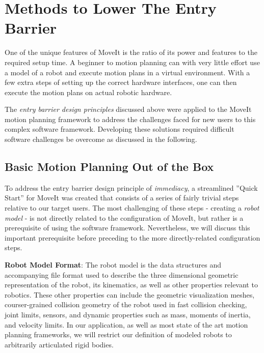 \documentclass[10pt,journal,compsoc]{joser1}
\begin{document}
{%
\section{Methods to Lower The Entry Barrier}
\label{sec::lowering_barriers}

One of the unique features of MoveIt is the ratio of its power and features to the required setup time. A beginner to motion planning can with very little effort use a model of a robot and execute motion plans in a virtual environment. With a few extra steps of setting up the correct hardware interfaces, one can then execute the motion plans on actual robotic hardware.

The \textit{entry barrier design principles} discussed above were applied to the MoveIt motion planning framework to address the challenges faced for new users to this complex software framework. Developing these solutions required difficult software challenges be overcome as discussed in the following.

\subsection{Basic Motion Planning Out of the Box}

To address the entry barrier design principle of \textit{immediacy}, a streamlined ''Quick Start'' for MoveIt was created that consists of a series of fairly trivial steps relative to our target users. The most challenging of these steps - creating a \textit{robot model} - is not directly related to the configuration of MoveIt, but rather is a prerequisite of using the software framework. Nevertheless, we will discuss this important prerequisite before preceding to the more directly-related configuration steps. 

{\bf Robot Model Format}: The robot model is the data structures and accompanying file format used to describe the three dimensional geometric representation of the robot, its kinematics, as well as other properties relevant to robotics. These other properties can include the geometric visualization meshes, courser-grained collision geometry of the robot used in fast collision checking, joint limits, sensors, and dynamic properties such as mass, moments of inertia, and velocity limits. In our application, as well as most state of the art motion planning frameworks, we will restrict our definition of modeled robots to arbitrarily articulated rigid bodies.

}
\end{document}
